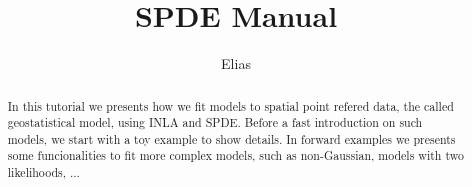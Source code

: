 \documentclass[a4paper,11pt]{report}
\title{SPDE Manual}
\author{Elias}
\begin{document}
\maketitle

\begin{abstract}
  In this tutorial we presents how we fit models 
  to spatial point refered data, the called 
  geostatistical model, using INLA and SPDE. 
  Before a fast introduction on such models, 
  we start with a toy example to show details. 
  In forward examples we presents some funcionalities 
  to fit more complex models, such as  non-Gaussian,  
  models with two likelihoods, ... 
\end{abstract} 

\tableofcontents









\end{document}
